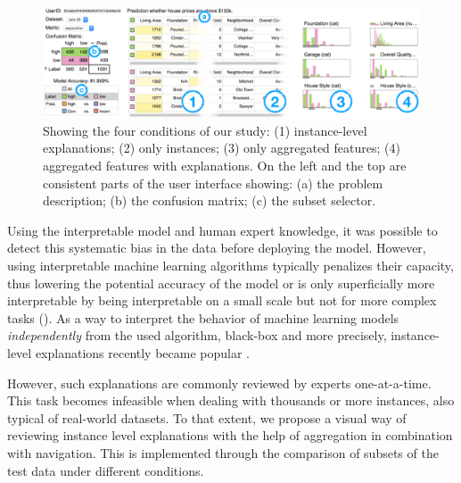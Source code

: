 \begin{figure}[t]
 \centering
 \includegraphics[width=\linewidth]{aggexplain/teaser.pdf}
 \caption[Showing the four study conditions.]{
Showing the four conditions of our study: (1) instance-level explanations; (2) only instances; (3) only aggregated features; (4) aggregated features with explanations.
On the left and the top are consistent parts of the user interface showing: (a) the problem description; (b) the confusion matrix; (c) the subset selector.
 }
 \label{figs:teaser}
\end{figure}

Using the interpretable model and human expert knowledge, it was possible to detect this systematic bias in the data before deploying the model.
However, using interpretable machine learning algorithms typically penalizes their capacity, thus lowering the potential accuracy of the model \cite{Caruana:2015:IMH:2783258.2788613} or is only superficially more interpretable by being interpretable on a small scale but not for more complex tasks (\cite{2016arXiv160603490L,2016arXiv160605685K}).
As a way to interpret the behavior of machine learning models \emph{independently} from the used algorithm, black-box and more precisely, instance-level explanations recently became popular \cite{Martens:2014:EDD:2600518.2600523,DBLP:journals/corr/RibeiroSG16,krause2016interacting}.

However, such explanations are commonly reviewed by experts one-at-a-time.
This task becomes infeasible when dealing with thousands or more instances, also typical of real-world datasets.
To that extent, we propose a visual way of reviewing instance level explanations with the help of aggregation in combination with navigation.
This is implemented through the comparison of subsets of the test data under different conditions.

